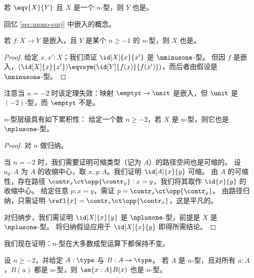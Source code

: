 \begin{cor}\label{cor:preservation-hlevels-weq}
 若 $\eqv{X}{Y}$ 且 $X$ 是一个 $n$-型，则 $Y$ 也是。
\end{cor}

回忆 \cref{sec:mono-surj} 中嵌入的概念。

\begin{thm}\label{thm:isntype-mono}
  若 $f:X\to Y$ 是嵌入，且 $Y$ 是某个 $n\ge -1$ 的 $n$-型，则 $X$ 也是。
\end{thm}
\begin{proof}
  给定 $x,x':X$；我们须证 $\id[X]{x}{x'}$ 是 $\nminusone$-型。
  但因 $f$ 是嵌入，$(\id[X]{x}{x'}) \eqvsym (\id[Y]{f(x)}{f(x')})$，而后者由假设是 $\nminusone$-型。
\end{proof}

注意当 $n=-2$ 时该定理失效：映射 $\emptyt \to \unit$ 是嵌入，但 $\unit$ 是 $(-2)$-型，而 $\emptyt$ 不是。

\begin{thm}\label{thm:hlevel-cumulative}
 $n$-型层级具有如下累积性：
 给定一个数 $n \geq -2$，若 $X$ 是 $n$-型，则它也是 $\nplusone$-型。
\end{thm}

\begin{proof}
 对 $n$ 做归纳。

 当 $n = -2$ 时，我们需要证明可缩类型（记为 $A$）的路径空间也是可缩的。
       设 $a_0: A$ 为 $A$ 的收缩中心，取 $x, y : A$。我们证明 $\id[A]{x}{y}$
       可缩。
       由 $A$ 的可缩性，存在路径 $\contr_x \ct \opp{\contr_y} : x = y$，我们将其取作
       $\id{x}{y}$ 的收缩中心。
       给定任意 $p : x = y$，需证 $p = \contr_x \ct \opp{\contr_y}$。
           由路径归纳，只需证明
        $\refl{x} = \contr_x \ct \opp{\contr_x}$，这是平凡的。

 对归纳步，我们需证明 $\id[X]{x}{y}$ 是 $\nplusone$-型，前提是
          $X$ 是 $\nplusone$-型。
         将归纳假设应用于 $\id[X]{x}{y}$ 即得所需结论。
\end{proof}


我们现在证明：$n$-型在大多数成型运算下都保持不变。

\begin{thm}\label{thm:ntypes-sigma}
 设 $n \geq -2$，并给定 $A : \type$ 与 $B : A \to \type$。
 若 $A$ 是 $n$-型，且对所有 $a : A$，$B(a)$ 都是 $n$-型，则 $\sm{x : A} B(x)$ 也是 $n$-型。
\end{thm}

